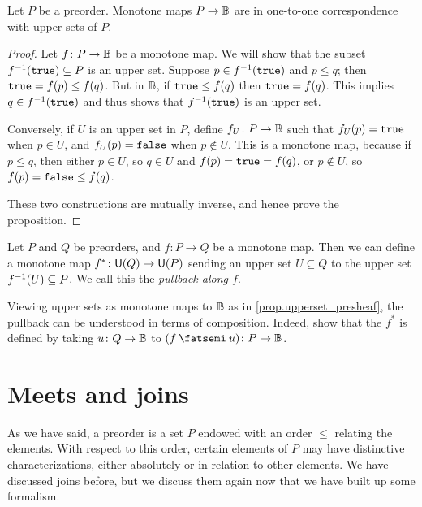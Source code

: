 \documentclass[7Sketches]{subfiles}
\begin{document}
\begin{proposition}%
\label{prop.upperset_presheaf}%
  Let $P$ be a preorder. Monotone maps $P \to \mathbb{B}$ are in one-to-one
  correspondence with upper sets of $P$.
\end{proposition}
\begin{proof}
  Let $f\colon P \to \mathbb{B}$ be a monotone map. We will show that the subset $f^{-1}(\mathtt{true})\subseteq P$ is an upper set. Suppose
$p \in f^{-1}(\mathtt{true})$ and $p \le q$; then $\mathtt{true} = f(p) \le f(q)$. But in $\mathbb{B}$, if $\mathtt{true}\leq f(q)$ then $\mathtt{true}=f(q)$. This implies $q \in f^{-1}(\mathtt{true})$ and thus shows that
$f^{-1}(\mathtt{true})$ is an upper set.

Conversely, if $U$ is an upper set in $P$, define $f_U\colon P \to \mathbb{B}$ such
that $f_U(p) =\mathtt{true}$ when $p \in U$, and $f_U(p) = \mathtt{false}$ when $p\not\in U$. This is a monotone
map, because if $p \le q$, then either $p \in U$, so $q \in U$ and $f(p) = \mathtt{true}= f(q)$,
or $p \notin U$, so $f(p) =\mathtt{false} \le f(q)$.

These two constructions are mutually inverse, and hence prove the proposition.
\end{proof}

\begin{exercise}%
%
\label{exc.pullback_upset}
  Let $P$ and $Q$ be preorders, and $f\colon P \to Q$ be a monotone map. Then we
  can define a monotone map $f^\ast\colon\mathsf{U}(Q) \to \mathsf{U}(P)$ sending an
  upper set $U \subseteq Q$ to the upper set $f^{-1} (U) \subseteq P$. We call this the
  \emph{pullback along $f$}.

  Viewing upper sets as monotone maps to $\mathbb{B}$ as in \cref{prop.upperset_presheaf}, the pullback can be understood in terms of composition. Indeed, show
  that the $f^\ast$ is defined by taking $u\colon Q \to \mathbb{B}$ to $(f\cp u)
  \colon P \to \bb$. 
\end{exercise}

%

\section{Meets and joins}%
\label{sec.meets_joins}%
%

As we have said, a preorder is a set $P$ endowed with an order $\leq$ relating the
elements. With respect to this order, certain elements of $P$ may have distinctive characterizations, either absolutely or in relation to other elements. We have discussed joins before, but we discuss them again
now that we have built up some formalism.
\end{document}
